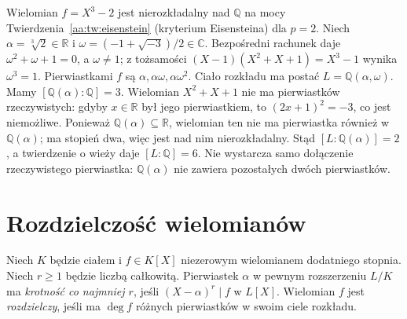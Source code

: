 \begin{przyklad}
\label{aa:prz:cubic-splitting}
Wielomian $f=X^3-2$ jest nierozkładalny nad
$\mathbb Q$ na mocy Twierdzenia~\ref{aa:tw:eisenstein}
(kryterium Eisensteina) dla $p=2$.
Niech $\alpha=\sqrt[3]2\in\mathbb R$ i
$\omega=(-1+\sqrt{-3})/2\in\mathbb C$.
Bezpośredni rachunek daje $\omega^2+\omega+1=0$,
a $\omega\ne1$; z tożsamości
$(X-1)(X^2+X+1)=X^3-1$ wynika $\omega^3=1$.
Pierwiastkami $f$ są
$\alpha,\alpha\omega,\alpha\omega^2$.
Ciało rozkładu ma postać
$L=\mathbb Q(\alpha,\omega)$.
Mamy $[\mathbb Q(\alpha):\mathbb Q]=3$.
Wielomian $X^2+X+1$ nie ma pierwiastków rzeczywistych:
gdyby $x\in\mathbb R$ był jego pierwiastkiem, to
$(2x+1)^2=-3$, co jest niemożliwe. Ponieważ
$\mathbb Q(\alpha)\subseteq\mathbb R$, wielomian ten
nie ma pierwiastka również w $\mathbb Q(\alpha)$;
ma stopień dwa, więc jest nad nim nierozkładalny.
Stąd $[L:\mathbb Q(\alpha)]=2$, a twierdzenie
o wieży daje $[L:\mathbb Q]=6$.
Nie wystarcza samo dołączenie rzeczywistego
pierwiastka: $\mathbb Q(\alpha)$ nie zawiera
pozostałych dwóch pierwiastków.
\end{przyklad}

\section{Rozdzielczość wielomianów}
\begin{definicja}
\label{aa:def:separable-polynomial}
Niech $K$ będzie ciałem i $f\in K[X]$ niezerowym
wielomianem dodatniego stopnia. Niech $r\ge1$ będzie
liczbą całkowitą. Pierwiastek $\alpha$
w pewnym rozszerzeniu $L/K$ ma \emph{krotność co najmniej
$r$}, jeśli $(X-\alpha)^r\mid f$ w $L[X]$.
Wielomian $f$ jest \emph{rozdzielczy}, jeśli ma
$\deg f$ różnych pierwiastków w swoim ciele rozkładu.
\end{definicja}

